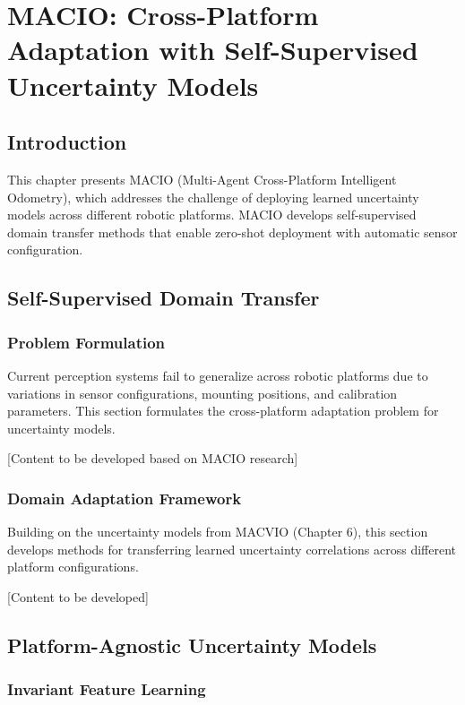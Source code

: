 \chapter{MACIO: Cross-Platform Adaptation with Self-Supervised Uncertainty Models} \label{chapter:macio}

\section{Introduction}

This chapter presents MACIO (Multi-Agent Cross-Platform Intelligent Odometry), which addresses the challenge of deploying learned uncertainty models across different robotic platforms. MACIO develops self-supervised domain transfer methods that enable zero-shot deployment with automatic sensor configuration.

\section{Self-Supervised Domain Transfer}

\subsection{Problem Formulation}

Current perception systems fail to generalize across robotic platforms due to variations in sensor configurations, mounting positions, and calibration parameters. This section formulates the cross-platform adaptation problem for uncertainty models.

[Content to be developed based on MACIO research]

\subsection{Domain Adaptation Framework}

Building on the uncertainty models from MACVIO (Chapter 6), this section develops methods for transferring learned uncertainty correlations across different platform configurations.

[Content to be developed]

\section{Platform-Agnostic Uncertainty Models}

\subsection{Invariant Feature Learning}

